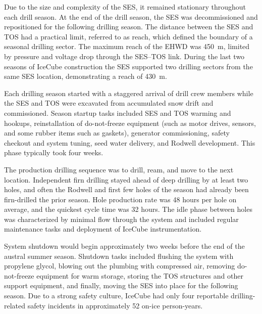 Due to the size and complexity of the SES, it remained stationary
throughout each drill season.  At the end of the drill season, the SES was
decommissioned and repositioned for the following drilling season.  The
distance between the SES and TOS had a practical limit, referred to as
reach, which defined the boundary of a seasonal drilling sector.  The
maximum reach
of the EHWD was 450~m, limited by pressure and voltage drop through the
SES--TOS link.  During the last two seasons of IceCube construction the SES
supported two drilling sectors from the same SES location, demonstrating a
reach of 430~m.

Each drilling season started with a staggered arrival of drill crew members
while the SES and TOS were excavated from accumulated snow drift and commissioned.  Season startup
tasks included SES and TOS warming and hookups, reinstallation of
do-not-freeze equipment (such as motor drives, sensors, and some
rubber items such as gaskets), generator commissioning, safety checkout and system
tuning, seed water delivery, and Rodwell development.  This phase typically
took four weeks.

The production drilling sequence was to drill, ream, and move to the next
location.  Independent firn drilling stayed ahead of deep drilling by at
least two holes, and often the Rodwell and first few holes of
the season had already been firn-drilled the prior season. Hole production rate was 48 hours per hole on average,
and the quickest cycle time was 32 hours. The idle phase
between holes was characterized by minimal flow through the
system and included regular maintenance tasks and deployment of IceCube
instrumentation.  

System shutdown would begin approximately two weeks before the end of the
austral summer season. Shutdown tasks included flushing the system with
propylene glycol, blowing out the plumbing with compressed air, removing
do-not-freeze equipment for warm storage, storing the TOS structures and
other support equipment, and finally, moving the SES into place for the
following season.  Due to a strong safety culture, IceCube had only
four reportable drilling-related safety incidents in approximately 52 on-ice 
person-years. 


